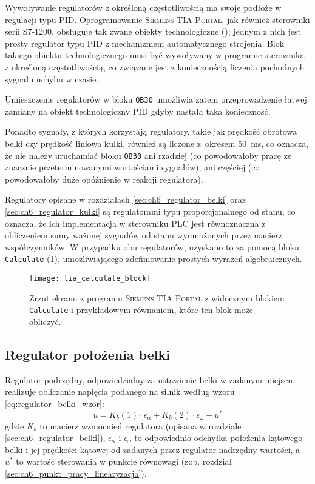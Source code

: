 Wywoływanie regulatorów z określoną częstotliwością ma swoje podłoże w regulacji typu PID. Oprogramowanie \textsc{Siemens TIA Portal}, jak również sterowniki serii S7-1200, obsługuje tak zwane obiekty technologiczne (\cite{S7MANUAL}\cite{SCL_S71200_S71500}); jednym z nich jest prosty regulator typu PID z mechanizmem automatycznego strojenia. Blok takiego obiektu technologicznego musi być wywoływany w programie sterownika z określoną częstotliwością, co związane jest z koniecznością liczenia pochodnych sygnału uchybu w czasie.

Umieszczenie regulatorów w bloku \texttt{OB30} umożliwia zatem przeprowadzenie łatwej zamiany na obiekt technologiczny PID gdyby nastała taka konieczność.

Ponadto sygnały, z których korzystają regulatory, takie jak prędkość obrotowa belki czy prędkość liniowa kulki, również są liczone z~okresem \SI{50}{\milli\second}, co oznacza, że nie należy uruchamiać bloku \texttt{OB30} ani rzadziej (co powodowałoby pracę ze znacznie przeterminowanymi wartościami sygnałów), ani częściej (co powodowałoby duże opóźnienie w reakcji regulatora).

Regulatory opisane w rozdziałach \ref{sec:ch6_regulator_belki} oraz \ref{sec:ch6_regulator_kulki} są regulatorami typu proporcjonalnego od stanu, co oznacza, że ich implementacja w sterowniku PLC jest równoznaczna z obliczeniem sumy ważonej syg\-nałów od stanu wymnożonych przez macierz współczynników. W przypadku obu regulatorów, uzyskano to za pomocą bloku \texttt{Calculate} (\cref{fig:tia_portal_blok_calculate}), umożliwiającego zdefiniowanie prostych wyrażeń algebraicznych.

\begin{figure}[h]
    \centering
    \texttt{[image: tia\_calculate\_block]}
    \caption{Zrzut ekranu z programu \textsc{Siemens TIA Portal} z widocznym blokiem \texttt{Calculate} i przykładowym równaniem, które ten blok może obliczyć.}
    \label{fig:tia_portal_blok_calculate}
\end{figure}


\subsection{Regulator położenia belki}
\label{subsec:ch7_regulator_belki}

Regulator podrzędny, odpowiedzialny za ustawienie belki w zadanym miejscu, realizuje obliczanie napięcia podanego na silnik według wzoru \eqref{eq:regulator_belki_wzor}:
\begin{equation}
    u = K_b(1) \cdot \epsilon_\alpha + K_b(2) \cdot \epsilon_\omega + u^*
    \label{eq:regulator_belki_wzor}
\end{equation}
gdzie $K_b$ to macierz wzmocnień regulatora (opisana w rozdziale \ref{sec:ch6_regulator_belki}), $\epsilon_\alpha$ i $\epsilon_\omega$ to odpowiednio odchyłka położenia kątowego belki i jej prędkości kątowej od zadanych przez regulator nadrzędny wartości, a $u^*$ to wartość sterowania w punkcie równowagi (zob. rozdział \ref{sec:ch6_punkt_pracy_linearyzacja}).

